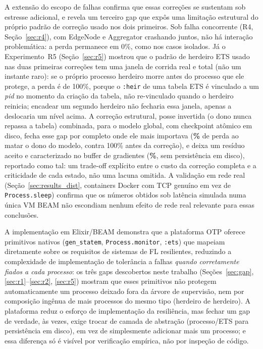 \documentclass[conference,a4paper]{IEEEtran}
\begin{document}
A extensão do escopo de falhas confirma que essas correções se sustentam
sob estresse adicional, e revela um terceiro gap que expôs uma limitação
estrutural do próprio padrão de correção usado nos dois primeiros. Sob
falha concorrente (R4, Seção~\ref{sec:r4}), com EdgeNode e Aggregator
crashando juntos, não há interação problemática: a perda permanece em
0\%, como nos casos isolados. Já o Experimento~R5 (Seção~\ref{sec:r5})
mostrou que o padrão de herdeiro ETS usado nas duas primeiras correções
tem uma janela de corrida real e total (não um instante raro): se o
próprio processo herdeiro morre antes do processo que ele protege, a
perda é de 100\%, porque o \texttt{:heir} de uma tabela ETS é vinculado a
um \textit{pid} no momento da criação da tabela, não re-vinculado quando
o herdeiro reinicia; encadear um segundo herdeiro não fecharia essa
janela, apenas a deslocaria um nível acima. A correção estrutural,
posse invertida (o dono nunca repassa a tabela) combinada, para o
modelo global, com checkpoint atômico em disco, fecha esse gap por
completo onde ele mais importava
(\textbf{\statExpRFiveModelOwnerDeadPct\%} de perda ao matar o dono do
modelo, contra 100\% antes da correção), e deixa um resíduo aceito e
caracterizado no buffer de gradientes
(\textbf{\statExpRFiveBufferOwnerDeadPct\%}, sem persistência em disco),
reportado como tal: um trade-off explícito entre o custo da correção
completa e a criticidade de cada estado, não uma lacuna omitida. A
validação em rede real (Seção~\ref{sec:results_dist}, containers Docker
com TCP genuíno em vez de \texttt{Process.sleep}) confirma que os números
obtidos sob latência simulada numa única VM BEAM não escondiam nenhum
efeito de rede real relevante para essas conclusões.

A implementação em Elixir/BEAM demonstra que a plataforma OTP oferece
primitivos nativos (\texttt{gen\_statem}, \texttt{Process.monitor},
\texttt{:ets}) que mapeiam diretamente sobre os requisitos de sistemas
de FL resilientes, reduzindo a complexidade de implementação de
tolerância a falhas \emph{quando corretamente fiados a cada processo}: os
três gaps descobertos neste trabalho (Seções~\ref{sec:gap},
\ref{sec:r1}--\ref{sec:r2}, \ref{sec:r5}) mostram que esses primitivos não
protegem automaticamente um processo deixado fora da árvore de supervisão,
nem por composição ingênua de mais processos do mesmo tipo (herdeiro de
herdeiro). A plataforma reduz o esforço de implementação da
resiliência, mas fechar um gap de verdade, às vezes, exige trocar de
camada de abstração (processo/ETS para persistência em disco), em vez de
simplesmente adicionar mais um processo; e essa diferença só é visível por verificação
empírica, não por inspeção de código.
\end{document}
